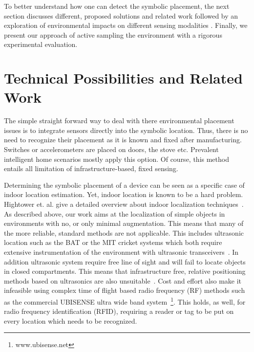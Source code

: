 To better understand how one can detect the symbolic placement, the
next section discusses different, proposed
solutions and related work followed by an exploration of environmental impacts on different sensing
modalities . Finally, we present our approach of active sampling the
environment with a rigorous experimental evaluation.


\section{Technical Possibilities and Related Work}

The simple straight forward way to deal with there environmental placement issues is
to integrate sensors directly into the symbolic location. Thus, there
is no need to recognize their placement as it is known and fixed after
manufacturing. Switches or accelerometers are placed on doors, the
stove etc. Prevalent intelligent home scenarios mostly apply this
option. Of course, this method entails all limitation of
infrastructure-based, fixed sensing.

Determining the symbolic placement of a device can be seen as a
specific case of indoor location estimation. Yet, indoor location is
known to be a hard problem. Hightower et. al. give a detailed overview about indoor localization techniques~\cite{hightower2001lsu}. 
As described above, our work aims at the localization of
simple objects in environments with no, or only minimal augmentation.
This means that many of the more reliable, standard methods are not
applicable. This includes ultrasonic location such as the BAT
 or the MIT cricket systems which
both require extensive instrumentation of the environment with
ultrasonic transceivers~\cite{128759,priyantha2000cls}. In addition ultrasonic system require free
line of sight and will fail to locate objects in closed
compartments. This means that infrastructure free, relative
positioning methods based on ultrasonics are
also unsuitable~\cite{1067190}. Cost and effort also make it infeasible using
complex time of flight based radio frequency (RF) methods such as the
commercial UBISENSE ultra wide band
system~\footnote{www.ubisense.net}. This holds, as well, for radio
frequency identification (RFID), requiring a reader or tag to be put
on every location which needs to be recognized.

